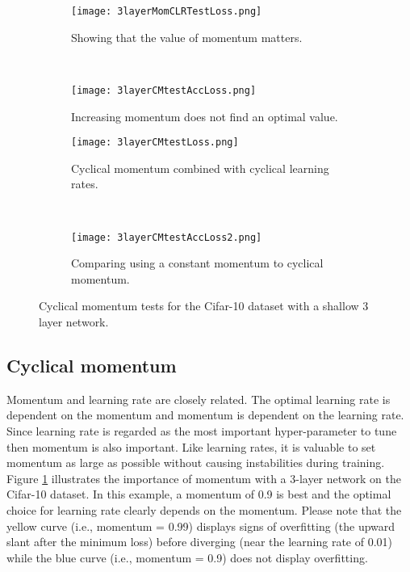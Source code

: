 \documentclass{article} %
\begin{document}
\begin{figure}[tbh]
	\centering
	\begin{subfigure}[b]{0.5\textwidth}
		\texttt{[image: 3layerMomCLRTestLoss.png]}
		\caption{Showing that the value of momentum matters.}
		\label{fig:3layerMomCLRTestLoss}       %
	\end{subfigure}
	\quad
	\hfill
	~ %
	\centering
	\begin{subfigure}[b]{0.43\textwidth}
		\texttt{[image: 3layerCMtestAccLoss.png]}
		\caption{Increasing momentum does not find an optimal value.}
		\label{fig:3layerCMtestAccLoss}       %
	\end{subfigure}
	\centering
	\begin{subfigure}[b]{0.5\textwidth}
		\texttt{[image: 3layerCMtestLoss.png]}
		\caption{Cyclical momentum combined with cyclical learning rates.}
		\label{fig:3layerCMtestLoss}       %
	\end{subfigure}
	\quad
	\hfill
	~ %
	\centering
	\begin{subfigure}[b]{0.43\textwidth}
		\texttt{[image: 3layerCMtestAccLoss2.png]}
		\caption{Comparing using a constant momentum to cyclical momentum.}
		\label{fig:3layerCMtestAccLoss2}       %
	\end{subfigure}
	\caption{Cyclical momentum tests for the Cifar-10 dataset with a shallow 3 layer network.}
	\label{fig:cyclicalMomentum2}
	\vspace{-10pt}	
\end{figure}


\subsection{Cyclical momentum}
\label{sec:CM}

Momentum and learning rate are closely related.  The optimal learning rate is dependent on the momentum and momentum is dependent on the learning rate.  Since learning rate is regarded as the most important hyper-parameter to tune \citep{bengio2012practical} then momentum is also important.   Like learning rates, it is valuable to set momentum as large as possible without causing instabilities during training.  Figure \ref{fig:3layerMomCLRTestLoss} illustrates the importance of momentum with a 3-layer network on the Cifar-10 dataset.  In this example, a momentum of 0.9 is best and the optimal choice for learning rate clearly depends on the momentum.  Please note that the yellow curve (i.e., momentum = 0.99) displays signs of overfitting (the upward slant after the minimum loss) before diverging (near the learning rate of 0.01) while the blue curve (i.e., momentum = 0.9) does not display overfitting.
\end{document}
